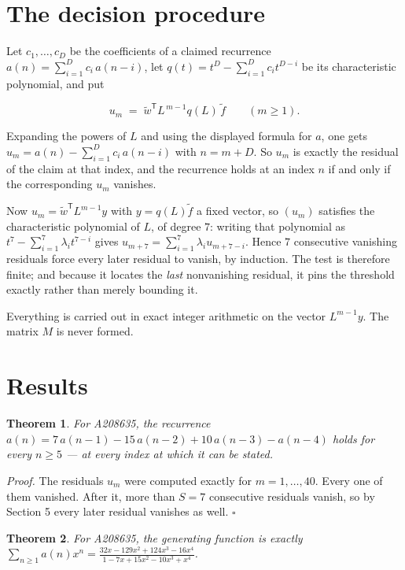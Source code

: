 \documentclass[11pt]{article}
\newtheorem{theorem}{Theorem}
\theoremstyle{definition}
\begin{document}
\section{The decision procedure}

Let $c_1,\dots,c_D$ be the coefficients of a claimed recurrence $a(n) = \sum_{i=1}^{D} c_i\,a(n-i)$, let $q(t) = t^{D} - \sum_{i=1}^{D} c_i t^{D-i}$ be its characteristic polynomial, and put

\[u_m \;=\; \tilde w^{\mathsf T} L^{\,m-1} q(L)\,\tilde f \qquad (m \ge 1).\]

Expanding the powers of $L$ and using the displayed formula for $a$, one gets $u_m = a(n) - \sum_{i=1}^{D} c_i\,a(n-i)$ with $n = m + D$. So $u_m$ is exactly the residual of the claim at that index, and the recurrence holds at an index $n$ if and only if the corresponding $u_m$ vanishes.

Now $u_m = \tilde w^{\mathsf T} L^{m-1} y$ with $y = q(L)\tilde f$ a fixed vector, so $(u_m)$ satisfies the characteristic polynomial of $L$, of degree $7$: writing that polynomial as $t^{7} - \sum_{i=1}^{7} \lambda_i t^{7-i}$ gives $u_{m+7} = \sum_{i=1}^{7} \lambda_i u_{m+7-i}$. Hence $7$ consecutive vanishing residuals force every later residual to vanish, by induction. The test is therefore finite; and because it locates the {\itshape last} nonvanishing residual, it pins the threshold exactly rather than merely bounding it.

Everything is carried out in exact integer arithmetic on the vector $L^{m-1}y$. The matrix $M$ is never formed.

\section{Results}

\begin{theorem} For A208635, the recurrence $a(n) = 7\,a(n-1) - 15\,a(n-2) + 10\,a(n-3) - a(n-4)$ holds for every $n \ge 5$ --- at every index at which it can be stated.\end{theorem}

{\itshape Proof.} The residuals $u_m$ were computed exactly for $m = 1,\dots,40$. Every one of them vanished. After it, more than $S = 7$ consecutive residuals vanish, so by Section 5 every later residual vanishes as well. $\square$

\begin{theorem} For A208635, the generating function is exactly $\sum_{n\ge 1} a(n)x^n = \frac{32x - 129x^{2} + 124x^{3} - 16x^{4}}{1 - 7x + 15x^{2} - 10x^{3} + x^{4}}$.\end{theorem}
\end{document}
